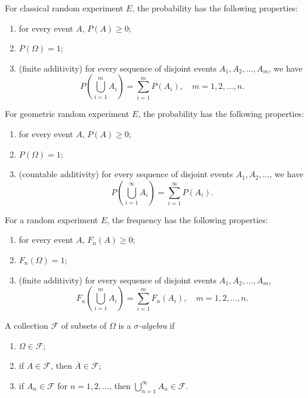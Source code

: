 \begin{theorem}
  For classical random experiment \(E\), the probability has the following properties:
  \begin{enumerate}
    \item for every event \(A\), \(P(A) \geq 0\);
    \item \(P(\Omega) = 1\);
    \item (finite additivity) for every sequence of disjoint events \(A_1, A_2, \dots, A_m\), we have
    \[
      P\left(\bigcup_{i=1}^m A_i\right) = \sum_{i=1}^m P(A_i), \quad m = 1, 2, \dots, n.
    \]
  \end{enumerate}
\end{theorem}

\begin{theorem}
  For geometric random experiment \(E\), the probability has the following properties:
  \begin{enumerate}
    \item for every event \(A\), \(P(A) \geq 0\);
    \item \(P(\Omega) = 1\);
    \item (countable additivity) for every sequence of disjoint events \(A_1, A_2, \dots\), we have
    \[
      P\left(\bigcup_{i=1}^\infty A_i\right) = \sum_{i=1}^\infty P(A_i).
    \]
  \end{enumerate}
\end{theorem}

\begin{theorem}
  For a random experiment \(E\), the frequency has the following properties:
  \begin{enumerate}
    \item for every event \(A\), \(F_n(A) \geq 0\);
    \item \(F_n(\Omega) = 1\);
    \item (finite additivity) for every sequence of disjoint events \(A_1, A_2, \dots, A_m\),
    \[
      F_n\left(\bigcup_{i=1}^m A_i\right) = \sum_{i=1}^m F_n(A_i), \quad m = 1, 2, \dots, n.
    \]
  \end{enumerate}
\end{theorem}

\begin{definition}
  A collection \(\mathcal{F}\) of subsets of \(\Omega\) is a \emph{\(\sigma\)-algebra} if
  \begin{enumerate}
    \item \(\Omega \in \mathcal{F}\);
    \item if \(A \in \mathcal{F}\), then \(\overline{A} \in \mathcal{F}\);
    \item if \(A_n \in \mathcal{F}\) for \(n = 1, 2, \dots\), then \(\bigcup_{n=1}^\infty A_n \in \mathcal{F}\).
  \end{enumerate}
\end{definition}

